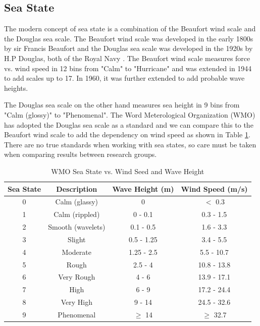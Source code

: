 \subsection {Sea State}
The modern concept of sea state is a combination of the Beaufort wind scale and the Douglas sea scale. The Beaufort wind scale was developed in the early 1800s by sir Francis Beaufort and the Douglas sea scale was developed in the 1920s by H.P Douglas, both of the Royal Navy \cite{uk_met_fact_sheet6}. The Beaufort wind scale measures force vs. wind speed in 12 bins from "Calm" to "Hurricane" and was extended in 1944 to add scales up to 17. In 1960, it was further extended to add probable wave heights. 

The Douglas sea scale on the other hand measures sea height in 9 bins from "Calm (glossy)" to "Phenomenal". The Word Meterological Organization (WMO) has adopted the Douglas sea scale as a standard \cite{wmo_code} and we can compare this to the Beaufort wind scale to add the dependency on wind speed as shown in Table \ref{os_tab:0}. There are no true standards when working with sea states, so care must be taken when comparing results between research groups.

\begin{table}[H]
  \begin{center}
      \renewcommand{\baselinestretch}{1} \small\normalsize
  \begin{quote}
    \caption[WMO Sea State vs. Wind Speed and Wave Height]{WMO Sea State vs. Wind Seed and Wave Height\label{os_tab:0}}
  \end{quote}
  \begin{tabular} {|c | c | c| c|}
    \hline
  \bf{Sea State} & \bf{Descriptio}n & \bf{Wave Height (m)} & \bf{Wind Speed (m/s)}\\ \hline
  0 & Calm (glassy) & 0 & $<$ 0.3 \\ \hline
  1 & Calm (rippled) & 0 - 0.1 & 0.3 - 1.5 \\ \hline
  2 & Smooth (wavelets) & 0.1 - 0.5 & 1.6 - 3.3 \\ \hline
  3 & Slight & 0.5 - 1.25 & 3.4 - 5.5 \\ \hline
  4 & Moderate & 1.25 - 2.5 & 5.5 - 10.7 \\ \hline
  5 & Rough & 2.5 - 4 & 10.8 - 13.8 \\ \hline
  6 & Very Rough & 4 - 6 & 13.9 - 17.1\\ \hline
  7 & High & 6 - 9 & 17.2 - 24.4\\ \hline
  8 & Very High & 9 - 14 & 24.5 - 32.6\\ \hline
  9 & Phenomenal & $\geq$ 14 & $\geq$ 32.7\\ \hline
\end{tabular}
\end{center}
\end{table}
\renewcommand{\baselinestretch}{2} \small\normalsize

